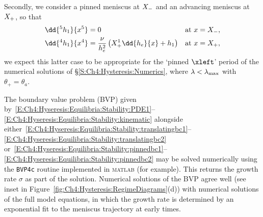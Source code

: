 Secondly, we consider a pinned meniscus at $X_{-}$ and an advancing meniscus at $X_{+}$, so that
\begin{align}
\dd{^5 h_1}{x^5}&=0 & &\text{at}~x = \xlefteq,\label{E:Ch4:Hyseresis:Equilibria:Stability:pinnedbc1} \\
\dd{^4 h_1}{x^4} &= \frac{\nu}{h_e^2} \left(X_+^1 \dd{h_e}{x} + h_1\right)& &\text{at}~x = \xrighteq,\label{E:Ch4:Hyseresis:Equilibria:Stability:pinnedbc2}
\end{align}
we expect this latter case to be appropriate for the `pinned $\xleft$' period of the numerical solutions of \S\ref{S:Ch4:Hysteresis:Numerics}, where $\lambda < \lambda_{\text{max}}$ with $\theta_+ = \theta_a$.

The boundary value problem (BVP) given by~\eqref{E:Ch4:Hyseresis:Equilibria:Stability:PDE1}--\eqref{E:Ch4:Hyseresis:Equilibria:Stability:kinematic} alongside either~\eqref{E:Ch4:Hyseresis:Equilibria:Stability:translatingbc1}--\eqref{E:Ch4:Hyseresis:Equilibria:Stability:translatingbc2} or~\eqref{E:Ch4:Hyseresis:Equilibria:Stability:pinnedbc1}--\eqref{E:Ch4:Hyseresis:Equilibria:Stability:pinnedbc2} may be solved numerically using the \texttt{BVP4c} routine implemented in \textsc{matlab} (for example). This returns the growth rate $\sigma$ as part of the solution. Numerical solutions of the BVP agree well (see inset in Figure~\ref{fig:Ch4:Hysteresis:RegimeDiagrams}(d)) with numerical solutions of the full model equations, in which the growth rate is determined by an exponential fit to the meniscus trajectory at early times.

